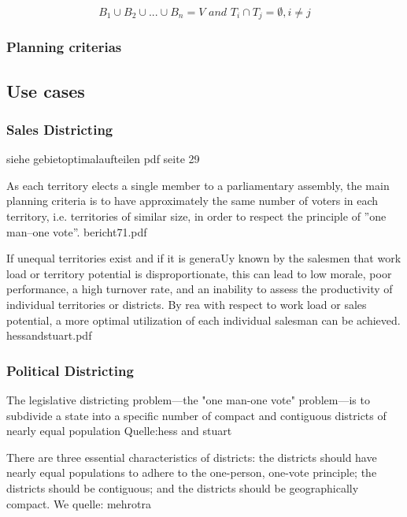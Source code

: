 \[ \mathit{B_{1} \cup B_{2} \cup ... \cup B_{n}=V \text{ and } T_{i} \cap T_{j}  =\emptyset, i \neq j}\]



\subsubsection{Planning criterias}


\subsection{Use cases}

\subsubsection{Sales Districting}

siehe gebietoptimalaufteilen pdf seite 29

As each territory elects a single member to a parliamentary assembly, the main
planning criteria is to have approximately the same number of voters in each territory, i.e.
territories of similar size, in order to respect the principle of ”one man–one vote”. bericht71.pdf

If unequal territories exist and if it is generaUy known by the salesmen
that work load or territory potential is disproportionate, this can lead to low morale,
poor performance, a high turnover rate, and an inability to assess the productivity of
individual territories or districts. By rea%
with respect to work load or sales potential, a more optimal utilization of each individual
salesman can be achieved.
hessandstuart.pdf

\subsubsection{Political Districting}
The legislative
districting problem—the "one man-one vote" problem—is to subdivide a state into a
specific number of compact and contiguous districts of nearly equal population 
Quelle:hess and stuart


There are three essential characteristics of districts:
the districts should have nearly equal populations to
adhere to the one-person, one-vote principle; the districts
should be contiguous; and the districts should be
geographically compact. We
quelle: mehrotra

